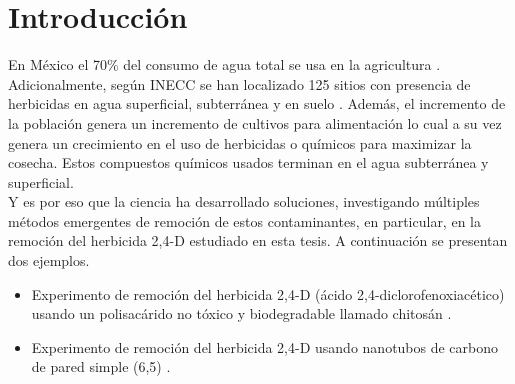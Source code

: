 \chapter{Introducción}


En México el 70\% del consumo de agua total se usa en la agricultura \cite{maguey2018}. Adicionalmente, según INECC se han localizado 125 sitios con presencia de herbicidas en agua superficial, subterránea y en suelo \cite{ineec2019}. Además, el incremento de la población genera un incremento de cultivos para alimentación lo cual a su vez genera un crecimiento en el uso de herbicidas o químicos para maximizar la cosecha. Estos compuestos químicos usados terminan en el agua subterránea y superficial.\\

Y es por eso que la ciencia ha desarrollado soluciones, investigando múltiples métodos emergentes de remoción de estos contaminantes, en particular, en la remoción del herbicida 2,4-D estudiado en esta tesis. A continuación se presentan dos ejemplos.

\begin{itemize}
    \item Experimento de remoción del herbicida 2,4-D (ácido 2,4-diclorofenoxiacético) usando un polisacárido no tóxico y biodegradable llamado chitosán \cite{Nunes2019}.
    \item Experimento de remoción del herbicida 2,4-D usando nanotubos de carbono de pared simple (6,5) \cite{rocha2017}.
\end{itemize}

